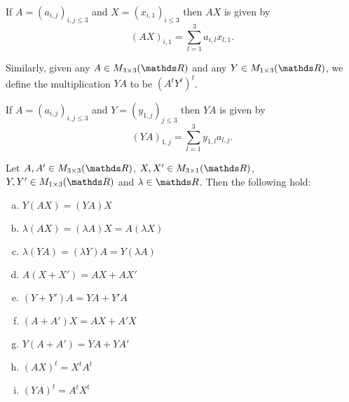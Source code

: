 \begin{lemma}
	If $A=(a_{i,j})_{i,j\leq 3}$ and $X=(x_{i,1})_{i\leq 3}$ then $AX$ is given by
	\[(AX)_{i,1}=\sum_{l=1}^3a_{i,l}x_{l,1}.\]
\end{lemma}

\begin{df}
	Similarly, given any $A\in M_{3\times 3}(\R)$ and any $Y\in M_{1\times 3}(\R)$, we define the multiplication $YA$ to be $(A^tY^t)^t$.
\end{df}

\begin{lemma}
	If $A=(a_{i,j})_{i,j\leq 3}$ and $Y=(y_{1,j})_{j\leq 3}$ then $YA$ is given by
\[(YA)_{1,j}=\sum_{l=1}^3y_{1,l}a_{l,j}.\]
\end{lemma}

\begin{prop}
	Let $A,A' \in M_{3\times 3}(\R)$, $X,X'\in M_{3\times 1}(\R)$, $Y,Y'\in M_{1\times 3}(\R)$ and $\lambda \in \R$. Then the following hold:
	\begin{multicols}{3}
		\begin{enumerate}[a)]
			\item $Y(AX)=(YA)X$
			\item $\lambda(AX)=(\lambda A)X=A(\lambda X)$
			\item $\lambda(YA)=(\lambda Y)A=Y(\lambda A)$
			\item $A(X+X')=AX+AX'$
			\item $(Y+Y')A=YA+Y'A$
			\item $(A+A')X=AX+A'X$
			\item $Y(A+A')=YA+YA'$
			\item $(AX)^t=X^tA^t$
			\item $(YA)^t=A^tX^t$
		\end{enumerate}
	\end{multicols}
\end{prop}